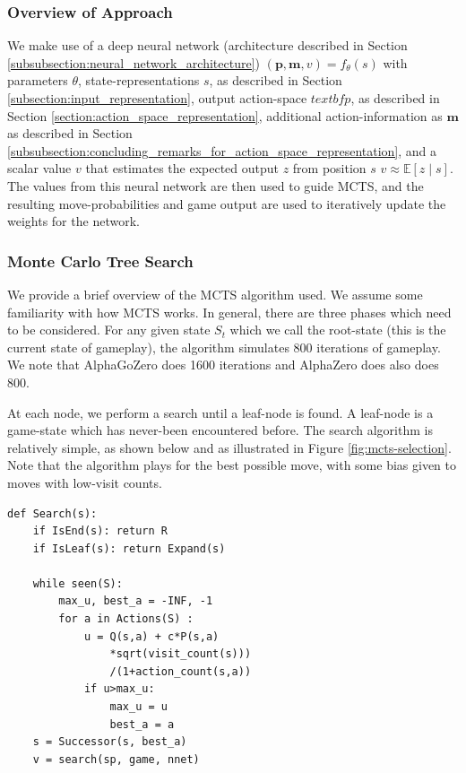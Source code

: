 \documentclass[10pt,twocolumn,letterpaper]{article}
\begin{document}
\subsubsection{Overview of Approach}
\label{subsubection:overview_of_approach}
We make use of a deep neural network (architecture described in Section \ref{subsubsection:neural_network_architecture}) $(\textbf{p}, \textbf{m}, v) = f_{\theta}(s)$ with parameters $\theta$, state-representations $s$, as described in Section \ref{subsection:input_representation}, output action-space $textbf{p}$, as described in Section \ref{section:action_space_representation}, additional action-information as $\textbf{m}$ as described in Section \ref{subsubsection:concluding_remarks_for_action_space_representation}, and a scalar value $v$ that estimates the expected output $z$ from position $s$ $v \approx \mathbb{E}[z \mid s]$. The values from this neural network are then used to guide MCTS, and the resulting move-probabilities and game output are used to iteratively update the weights for the network.

\subsubsection{Monte Carlo Tree Search} 
We provide a brief overview of the MCTS algorithm used. We assume some familiarity with how MCTS works. In general, there are three phases which need to be considered. For any given state $S_t$ which we call the root-state (this is the current state of gameplay), the algorithm simulates 800 iterations of gameplay. We note that AlphaGoZero \cite{AlphaGoZero} does 1600 iterations and AlphaZero does \cite{AlphaZero} also does 800.

At each node, we perform a search until a leaf-node is found. A leaf-node is a game-state which has never-been encountered before. The search algorithm is relatively simple, as shown below and as illustrated in Figure \ref{fig:mcts-selection}. Note that the algorithm plays for the best possible move, with some bias given to moves with low-visit counts.

\begin{verbatim}
def Search(s):
    if IsEnd(s): return R
    if IsLeaf(s): return Expand(s)

    while seen(S):
        max_u, best_a = -INF, -1
        for a in Actions(S) :
            u = Q(s,a) + c*P(s,a)
                *sqrt(visit_count(s)))
                /(1+action_count(s,a))
            if u>max_u:
                max_u = u
                best_a = a
    s = Successor(s, best_a)
    v = search(sp, game, nnet)
\end{verbatim}
\end{document}
